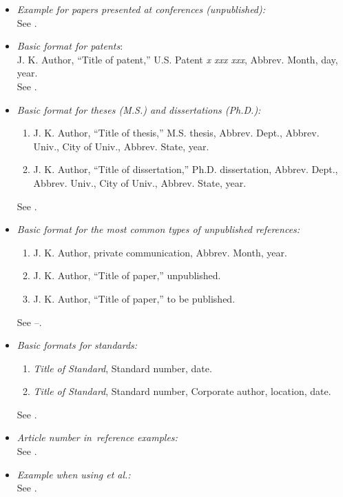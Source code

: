 \documentclass{ieeeaccess}
\begin{document}
\begin{itemize}
\item \emph{Example for papers presented at conferences (unpublished):}\\
See \cite{b23}.

\item \emph{Basic format for patents}$:$\\
J. K. Author, ``Title of patent,'' U.S. Patent \emph{x xxx xxx}, Abbrev. Month, day, year.\\
See \cite{b24}.

\item \emph{Basic format for theses (M.S.) and dissertations (Ph.D.):}
\begin{enumerate}
\item J. K. Author, ``Title of thesis,'' M.S. thesis, Abbrev. Dept., Abbrev. Univ., City of Univ., Abbrev. State, year.
\item J. K. Author, ``Title of dissertation,'' Ph.D. dissertation, Abbrev. Dept., Abbrev. Univ., City of Univ., Abbrev. State, year.
\end{enumerate}
See \cite{b25,b26}.

\item \emph{Basic format for the most common types of unpublished references:}
\begin{enumerate}
\item J. K. Author, private communication, Abbrev. Month, year.
\item J. K. Author, ``Title of paper,'' unpublished.
\item J. K. Author, ``Title of paper,'' to be published.
\end{enumerate}
See \cite{b27}--\cite{b29}.

\item \emph{Basic formats for standards:}
\begin{enumerate}
\item \emph{Title of Standard}, Standard number, date.
\item \emph{Title of Standard}, Standard number, Corporate author, location, date.
\end{enumerate}
See \cite{b30,b31}.

\item \emph{Article number in~reference examples:}\\
See \cite{b32,b33}.

\item \emph{Example when using et al.:}\\
See \cite{b34}.

\end{itemize}
\end{document}
